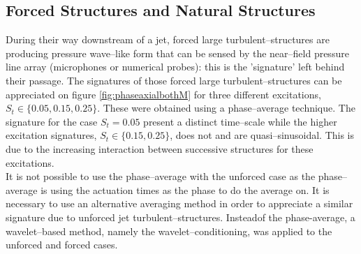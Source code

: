 \documentclass[english]{aiaa-tc}
\begin{document}
\subsection{Forced Structures and Natural Structures}%
During their way downstream of a jet, forced large turbulent--structures are producing pressure wave--like form that can be sensed by the near--field pressure line array (microphones or numerical probes): this is the 'signature' left behind their passage. The signatures of those forced large turbulent--structures can be appreciated on figure \ref{fig:phaseaxialbothM} for three different excitations, $S_t \in \{ 0.05, 0.15, 0.25 \}$. These were obtained using a phase--average technique. The signature for the case $S_t = 0.05$ present a distinct time--scale while the higher excitation signatures, $S_t \in \{ 0.15, 0.25 \}$, does not and are quasi--sinusoidal. This is due to the increasing interaction between successive structures for these excitations. \\
It is not possible to use the phase--average with the unforced case as the phase--average is using the actuation times as the phase to do the average on.
It is necessary to use an alternative averaging method in order to appreciate a similar signature due to unforced jet turbulent--structures.
Insteadof the phase-average, a wavelet--based method, namely the wavelet--conditioning, was applied to the unforced and forced cases.
\end{document}
